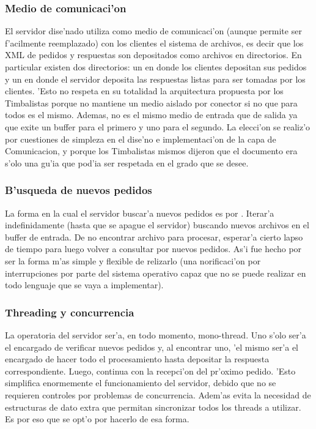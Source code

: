 \subsubsection{Medio de comunicaci'on}
El servidor dise'nado utiliza como medio de comunicaci'on (aunque permite ser f'acilmente reemplazado) con los clientes el sistema de archivos, es decir que los XML de pedidos y respuestas son depositados como archivos en directorios. En particular existen dos directorios: un  en donde los clientes depositan sus pedidos y un  en donde el servidor deposita las respuestas listas para ser tomadas por los clientes. 'Esto no respeta en su totalidad la arquitectura propuesta por los Timbalistas porque no mantiene un medio aislado por conector si no que para todos es el mismo. Ademas, no es el mismo medio de entrada que de salida ya que exite un buffer para el primero y uno para el segundo. La elecci'on se realiz'o por cuestiones de simpleza en el dise'no e implementaci'on de la capa de Comunicacion, y porque los Timbalistas mismos dijeron que el documento era s'olo una gu'ia que pod'ia ser respetada en el grado que se desee.

\subsubsection{B'usqueda de nuevos pedidos}
La forma en la cual el servidor buscar'a nuevos pedidos es por . Iterar'a indefinidamente (hasta que se apague el servidor) buscando nuevos archivos en el buffer de entrada. De no encontrar archivo para procesar, esperar'a cierto lapso de tiempo para luego volver a consultar por nuevos pedidos. As'i fue hecho por ser la forma m'as simple y flexible de relizarlo (una norificaci'on por interrupciones por parte del sistema operativo capaz que no se puede realizar en todo lenguaje que se vaya a implementar).

\subsubsection{Threading y concurrencia}
La operatoria del servidor ser'a, en todo momento, mono-thread. Uno s'olo ser'a el encargado de verificar nuevos pedidos y, al encontrar uno, 'el mismo ser'a el encargado de hacer todo el procesamiento hasta depositar la respuesta correspondiente. Luego, continua con la recepci'on del pr'oximo pedido. 'Esto simplifica enormemente el funcionamiento del servidor, debido que no se requieren controles por problemas de concurrencia. Adem'as evita la necesidad de estructuras de dato extra que permitan sincronizar todos los threads a utilizar. Es por eso que se opt'o por hacerlo de esa forma.

